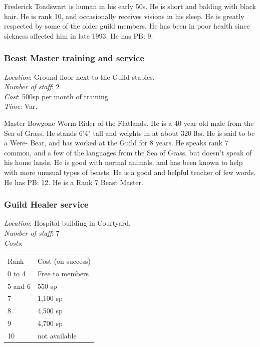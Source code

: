 \documentclass[twoside,a4paper]{article}
\begin{document}
\begin{multicols}{2}
Frederick Toadswart is human in his early 50s. He is short and balding
with black hair.  He is rank 10, and occasionally receives visions in
his sleep. He is greatly respected by some of the older guild
members. He has been in poor health since sickness affected him in
late 1993. He has PB: 9.

\subsubsection{Beast Master training and service}

\begin{flushleft}
\emph{Location}: Ground floor next to the Guild stables. \\
\emph{Number of staff}: 2 \\
\emph{Cost}: 500sp per month of training. \\
\emph{Time}: Var. \\
\end{flushleft}
Master Bowgone Worm-Rider of the Flatlands. He is a 40 year old male
from the Sea of Grass. He stands 6'4" tall and weights in at about 320
lbs. He is said to be a Were- Bear, and has worked at the Guild for 8
years.  He speaks rank 7 common, and a few of the languages from the
Sea of Grass, but doesn't speak of his home lands. He is good with
normal animals, and has been known to help with more unusual types of
beasts. He is a good and helpful teacher of few words. He has PB: 12.
He is a Rank 7 Beast Master.

\subsubsection{Guild Healer service}

\begin{flushleft}
\emph{Location}: Hospital building in Courtyard. \\
\emph{Number of staff}: 7 \\
\emph{Costs}:\\
\begin{tabular}{ll}
Rank	& Cost (on success) \\
0 to 4	& Free to members \\
5 and 6	& 550 sp \\
7	& 1,100 sp \\
8	& 4,500 sp \\
9	& 4,700 sp \\
10	& not available \\
\end{tabular}
\end{flushleft}


\end{multicols}
\end{document}
